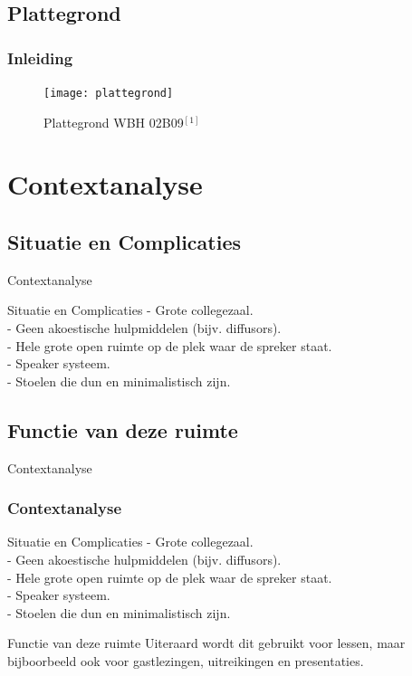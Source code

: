 \documentclass{beamer}
\begin{document}
\subsection{Plattegrond}

\begin{frame}
\frametitle{Inleiding}
\begin{figure}
  \texttt{[image: plattegrond]}
  \caption{Plattegrond WBH 02B09$^{[1]}$}
\end{figure}
\end{frame}




\section{Contextanalyse}
\subsection{Situatie en Complicaties}
\begin{frame}{Contextanalyse}
\begin{block}{Situatie en Complicaties}
  - Grote collegezaal.\\
  - Geen akoestische hulpmiddelen (bijv. diffusors).\\
  - Hele grote open ruimte op de plek waar de spreker staat.\\
  - Speaker systeem.\\
  - Stoelen die dun en minimalistisch zijn.
\end{block}
\end{frame}

\subsection{Functie van deze ruimte}
\begin{frame}{Contextanalyse}
\frametitle{Contextanalyse}
\begin{block}{Situatie en Complicaties}
  - Grote collegezaal.\\
  - Geen akoestische hulpmiddelen (bijv. diffusors).\\
  - Hele grote open ruimte op de plek waar de spreker staat.\\
  - Speaker systeem.\\
  - Stoelen die dun en minimalistisch zijn.
\end{block}
\begin{block}{Functie van deze ruimte}
  Uiteraard wordt dit gebruikt voor lessen, maar bijboorbeeld ook voor gastlezingen, uitreikingen en presentaties.
\end{block}
\end{frame}
\end{document}
